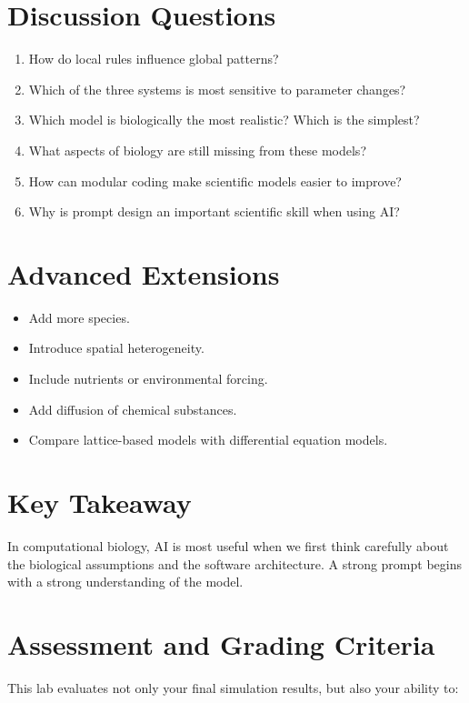 \documentclass[paper=letter, fontsize=12pt]{article}
\numberwithin{equation}{section}
\begin{document}
\section*{Discussion Questions}

\begin{enumerate}
\item How do local rules influence global patterns?
\item Which of the three systems is most sensitive to parameter changes?
\item Which model is biologically the most realistic? Which is the simplest?
\item What aspects of biology are still missing from these models?
\item How can modular coding make scientific models easier to improve?
\item Why is prompt design an important scientific skill when using AI?
\end{enumerate}

\section*{Advanced Extensions}

\begin{itemize}
\item Add more species.
\item Introduce spatial heterogeneity.
\item Include nutrients or environmental forcing.
\item Add diffusion of chemical substances.
\item Compare lattice-based models with differential equation models.
\end{itemize}

\section*{Key Takeaway}
In computational biology, AI is most useful when we first think carefully about the biological assumptions and the software architecture. A strong prompt begins with a strong understanding of the model.

\newpage
\section*{Assessment and Grading Criteria}

This lab evaluates not only your final simulation results, but also your ability to:
\end{document}
